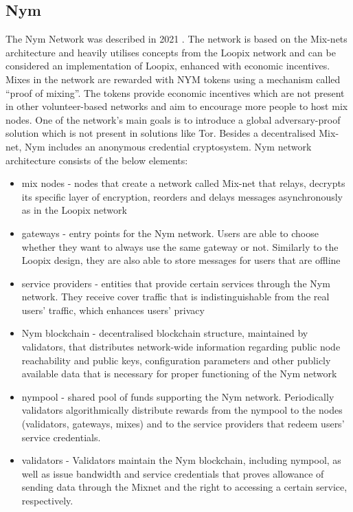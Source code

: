 \subsection{Nym}
The Nym Network was described in 2021 \cite{nym}. The network is based on the Mix-nets architecture and heavily utilises concepts from the Loopix network and can be considered an implementation of Loopix, enhanced with economic incentives. Mixes in the network are rewarded with NYM tokens using a mechanism called “proof of mixing”. The tokens provide economic incentives which are not present in other volunteer-based networks and aim to encourage more people to host mix nodes. One of the network’s main goals is to introduce a global adversary-proof solution which is not present in solutions like Tor. Besides a decentralised Mix-net, Nym includes an anonymous credential cryptosystem.
Nym network architecture consists of the below elements:
\begin{itemize}
    \item mix nodes - nodes that create a network called Mix-net that relays, decrypts its specific layer of encryption, reorders and delays messages asynchronously as in the Loopix network
    \item gateways - entry points for the Nym network. Users are able to choose whether they want to always use the same gateway or not. Similarly to the Loopix design, they are also able to store messages for users that are offline
    \item service providers - entities that provide certain services through the Nym network. They receive cover traffic that is indistinguishable from the real users’ traffic, which enhances users’ privacy
    \item Nym blockchain - decentralised blockchain structure, maintained by validators, that distributes network-wide information regarding public node reachability and public keys, configuration parameters and other publicly available data that is necessary for proper functioning of the Nym network
    \item nympool - shared pool of funds supporting the Nym network. Periodically validators algorithmically distribute rewards from the nympool to the nodes (validators, gateways, mixes) and to the service providers that redeem users’ service credentials.
    \item validators - Validators maintain the Nym blockchain, including nympool, as well as issue bandwidth and service credentials that proves allowance of sending data through the Mixnet and the right to accessing a certain service, respectively.
\end{itemize}

